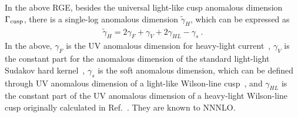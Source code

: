\documentclass[a4paper,11pt]{article}
\begin{document}
In the above RGE, besides the universal light-like cusp anomalous dimension $\Gamma_{\rm cusp}$, there is a single-log anomalous dimension $\tilde \gamma_{H}$, which can be expressed as~\cite{Ji:2019ewn,Ji:2021znw,Ji:2023pba}
\begin{align}\label{eq:heavylighsuda}
\tilde \gamma_{H}=2\gamma_{F}+\gamma_V+2\gamma_{HL}-\gamma_s  \ .
\end{align}
In the above, $\gamma_F$ is the UV anomalous dimension for heavy-light current~\cite{Ji:1991pr,Braun:2020ymy}, $\gamma_V$ is the constant part for the anomalous dimension of the standard light-light Sudakov hard kernel~\cite{Becher:2006mr},  $\gamma_s$ is the soft anomalous dimension, which can be defined through UV anomalous dimension of a light-like Wilson-line cusp~\cite{korchemskaya:1992je}, and $\gamma_{HL}$ is the constant part of the UV anomalous dimension of a heavy-light Wilson-line cusp originally calculated in Ref.~\cite{Korchemsky:1992xv}. They are known to NNNLO. 
\end{document}
